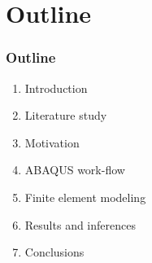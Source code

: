 \section{Outline}
\begin{frame}
\frametitle{Outline}
\begin{enumerate}
	\item Introduction
	\item Literature study
	\item Motivation
	\item ABAQUS work-flow
	\item Finite element modeling
	\item Results and inferences
	\item Conclusions
\end{enumerate}
\end{frame}